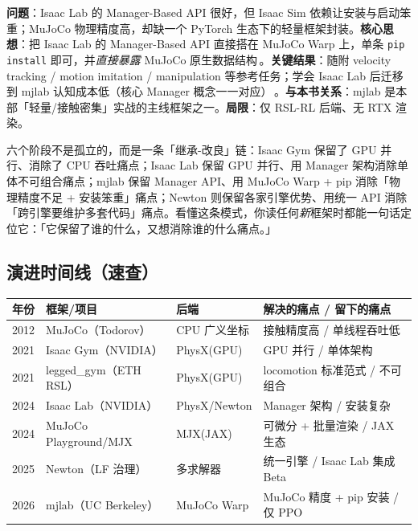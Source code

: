 \begin{paper}\label{paper:rlmc-eco-mjlab}
\textbf{问题}：Isaac Lab 的 Manager-Based API 很好，但 Isaac Sim 依赖让安装与启动笨重；MuJoCo 物理精度高，却缺一个 PyTorch 生态下的轻量框架封装。\textbf{核心思想}：把 Isaac Lab 的 Manager-Based API 直接搭在 MuJoCo Warp 上，单条 \verb|pip install| 即可，并\emph{直接暴露} MuJoCo 原生数据结构\,\cite{mjlab2026}。\textbf{关键结果}：随附 velocity tracking / motion imitation / manipulation 等参考任务；学会 Isaac Lab 后迁移到 mjlab 认知成本低（核心 Manager 概念一一对应）\,\cite{mjlab2026}。\textbf{与本书关系}：mjlab 是本部「轻量/接触密集」实战的主线框架之一。\textbf{局限}：仅 RSL-RL 后端、无 RTX 渲染。
\end{paper}

\begin{insight}\label{ins:rlmc-eco-pattern}
六个阶段不是孤立的，而是一条「继承-改良」链：Isaac Gym 保留了 GPU 并行、消除了 CPU 吞吐痛点；Isaac Lab 保留 GPU 并行、用 Manager 架构消除单体不可组合痛点；mjlab 保留 Manager API、用 MuJoCo Warp + pip 消除「物理精度不足 + 安装笨重」痛点；Newton 则保留各家引擎优势、用统一 API 消除「跨引擎要维护多套代码」痛点。看懂这条模式，你读任何\emph{新}框架时都能一句话定位它：「它保留了谁的什么，又想消除谁的什么痛点。」
\end{insight}

\subsection{演进时间线（速查）}

\begin{center}
\small
\begin{tabular}{@{}llll@{}}
\toprule
年份 & 框架/项目 & 后端 & 解决的痛点 / 留下的痛点 \\
\midrule
2012 & MuJoCo（Todorov） & CPU 广义坐标 & 接触精度高 / 单线程吞吐低 \\
2021 & Isaac Gym（NVIDIA） & PhysX(GPU) & GPU 并行 / 单体架构 \\
2021 & legged\_gym（ETH RSL） & PhysX(GPU) & locomotion 标准范式 / 不可组合 \\
2024 & Isaac Lab（NVIDIA） & PhysX/Newton & Manager 架构 / 安装复杂 \\
2024 & MuJoCo Playground/MJX & MJX(JAX) & 可微分 + 批量渲染 / JAX 生态 \\
2025 & Newton（LF 治理） & 多求解器 & 统一引擎 / Isaac Lab 集成 Beta \\
2026 & mjlab（UC Berkeley） & MuJoCo Warp & MuJoCo 精度 + pip 安装 / 仅 PPO \\
\bottomrule
\end{tabular}
\end{center}

